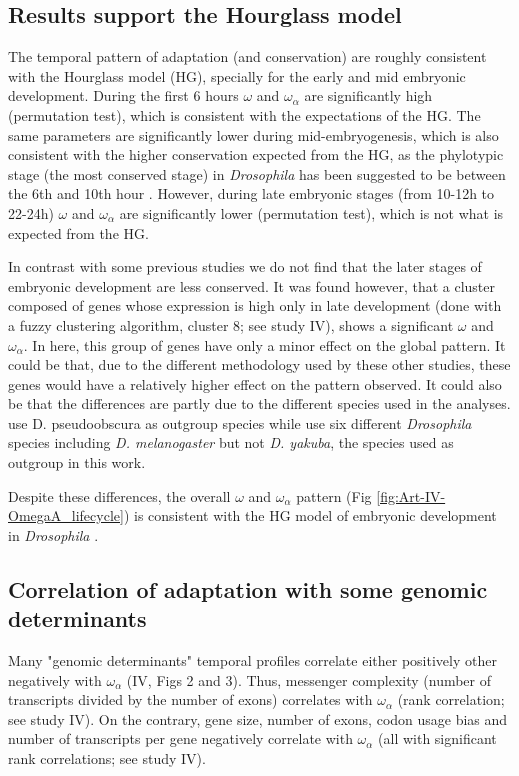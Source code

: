 \subsection{Results support the Hourglass model}

The temporal pattern of adaptation (and conservation) are roughly consistent with the Hourglass model (HG), specially for the early and mid embryonic development.
During the first 6 hours $\omega$ and $\omega_{\alpha}$ are significantly high (permutation test), which is consistent with the expectations of the HG.
The same parameters are significantly lower during mid-embryogenesis, which is also consistent with the higher conservation expected from the HG, as the phylotypic stage (the most conserved stage) in \textit{Drosophila} has been suggested to be between the 6th and 10th hour \citep{Drost2015}.
However, during late embryonic stages (from 10-12h to 22-24h) $\omega$ and $\omega_{\alpha}$ are significantly lower (permutation test), which is not what is expected from the HG.

In contrast with some previous studies \citep{Davis2005,Kalinka2010} we do not find that the later stages of embryonic development are less conserved. 
It was found however, that a cluster composed of genes whose expression is high only in late development (done with a fuzzy clustering algorithm, cluster 8; see study IV), shows a significant $\omega$ and $\omega_{\alpha}$. In here, this group of genes have only a minor effect on the global pattern.
It could be that, due to the different methodology used by these other studies, these genes would have a relatively higher effect on the pattern observed. It could also be that the differences are partly due to the different species used in the analyses.\citet{Davis2005} use D. pseudoobscura as outgroup species while \citet{Kalinka2010} use six different \textit{Drosophila} species including \textit{D. melanogaster} but not \textit{D. yakuba}, the species used as outgroup in this work.

Despite these differences, the overall $\omega$ and $\omega_{\alpha}$ pattern (Fig \ref{fig:Art-IV-OmegaA_lifecycle}) is consistent with the HG model of embryonic development in \textit{Drosophila} \citep{Kalinka2010}.


\subsection{Correlation of adaptation with some genomic determinants}
Many "genomic determinants" temporal profiles correlate either positively other negatively with $\omega_{\alpha}$ (IV, Figs 2 and 3). 
%
Thus, messenger complexity (number of transcripts divided by the number of exons) correlates with $\omega_{\alpha}$ (rank correlation; see study IV). On the contrary, gene size, number of exons, codon usage bias and number of transcripts per gene negatively correlate with $\omega_{\alpha}$ (all with significant rank correlations; see study IV). 

